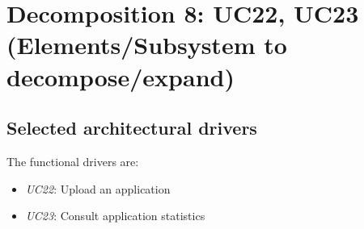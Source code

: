 \section{Decomposition 8: UC22, UC23 (Elements/Subsystem to decompose/expand)}


\subsection*{Selected architectural drivers}
    The functional drivers are:
    \begin{itemize}
        \item \emph{UC22}: Upload an application
        \item \emph{UC23}: Consult application statistics
    \end{itemize}

